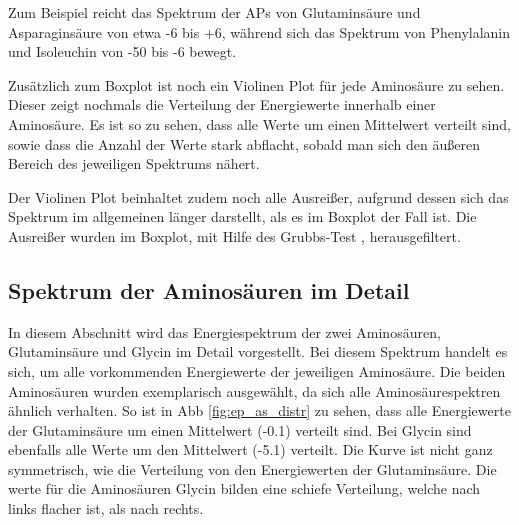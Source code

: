 Zum Beispiel reicht das Spektrum der \ac{APs} von Glutaminsäure und Asparaginsäure von etwa -6 bis +6, während sich das Spektrum von Phenylalanin und Isoleuchin von -50 bis -6 bewegt. 

Zusätzlich zum Boxplot ist noch ein Violinen Plot für jede Aminosäure zu sehen. Dieser zeigt nochmals die Verteilung der Energiewerte innerhalb einer Aminosäure. Es ist so zu sehen, dass alle Werte um einen Mittelwert verteilt sind, sowie dass die Anzahl der Werte stark abflacht, sobald man sich den äußeren Bereich des jeweiligen Spektrums nähert.

Der Violinen Plot beinhaltet zudem noch alle Ausreißer, aufgrund dessen sich das Spektrum im allgemeinen länger darstellt, als es im Boxplot der Fall ist. Die Ausreißer wurden im Boxplot, mit Hilfe des Grubbs-Test \cite{Jain.2010}, herausgefiltert. 


\newpage
\subsection{Spektrum der Aminosäuren im Detail}
In diesem Abschnitt wird das Energiespektrum der zwei Aminosäuren, Glutaminsäure und Glycin im Detail vorgestellt. Bei diesem Spektrum handelt es sich, um alle vorkommenden Energiewerte der jeweiligen Aminosäure. Die beiden Aminosäuren wurden exemplarisch ausgewählt, da sich alle Aminosäurespektren ähnlich verhalten. So ist in \ac{Abb} \ref{fig:ep_as_distr} zu sehen, dass alle Energiewerte der Glutaminsäure um einen Mittelwert (-0.1) verteilt sind. Bei Glycin sind ebenfalls alle Werte um den Mittelwert (-5.1) verteilt. Die Kurve ist nicht ganz symmetrisch, wie die Verteilung von den Energiewerten der Glutaminsäure. Die werte für die Aminosäuren Glycin bilden eine schiefe Verteilung, welche nach links flacher ist, als nach rechts. 

